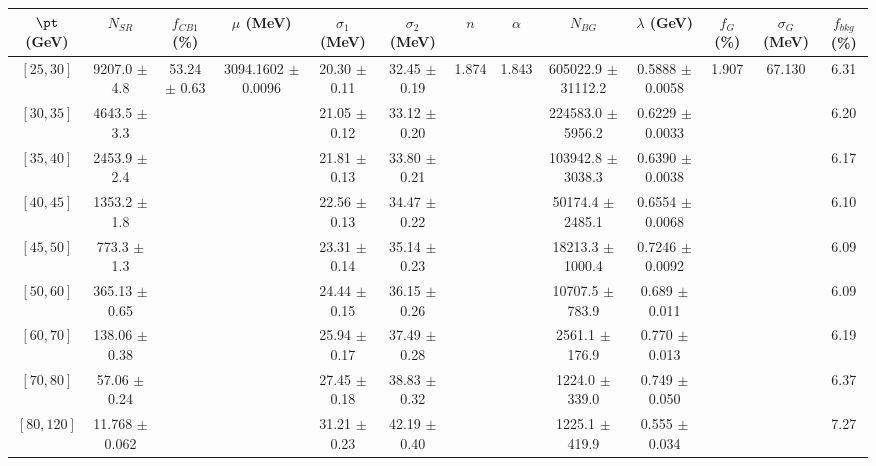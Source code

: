 \begin{tabular}{c||c|c|c|c|c|c|c|c|c|c|c||c}
$\pt$ (GeV) & $N_{SR}$ & $f_{CB1}$ (\%) & $\mu$ (MeV) & $\sigma_1$ (MeV) & $\sigma_2$ (MeV) & $n$ & $\alpha$ & $N_{BG}$ & $\lambda$ (GeV) & $f_G$ (\%) & $\sigma_G$ (MeV) & $f_{bkg}$ (\%) \\
\hline
$[25, 30]$ & 9207.0 $\pm$ 4.8 & \multirow{9}{*}{53.24 $\pm$ 0.63} & \multirow{9}{*}{3094.1602 $\pm$ 0.0096} & 20.30 $\pm$ 0.11 & 32.45 $\pm$ 0.19 & \multirow{9}{*}{1.874} & \multirow{9}{*}{1.843} & 605022.9 $\pm$ 31112.2 & 0.5888 $\pm$ 0.0058 & \multirow{9}{*}{1.907} & \multirow{9}{*}{67.130} & 6.31\\
$[30, 35]$ & 4643.5 $\pm$ 3.3 &  &  & 21.05 $\pm$ 0.12 & 33.12 $\pm$ 0.20 &  &  & 224583.0 $\pm$ 5956.2 & 0.6229 $\pm$ 0.0033 &  &  & 6.20\\
$[35, 40]$ & 2453.9 $\pm$ 2.4 &  &  & 21.81 $\pm$ 0.13 & 33.80 $\pm$ 0.21 &  &  & 103942.8 $\pm$ 3038.3 & 0.6390 $\pm$ 0.0038 &  &  & 6.17\\
$[40, 45]$ & 1353.2 $\pm$ 1.8 &  &  & 22.56 $\pm$ 0.13 & 34.47 $\pm$ 0.22 &  &  & 50174.4 $\pm$ 2485.1 & 0.6554 $\pm$ 0.0068 &  &  & 6.10\\
$[45, 50]$ & 773.3 $\pm$ 1.3 &  &  & 23.31 $\pm$ 0.14 & 35.14 $\pm$ 0.23 &  &  & 18213.3 $\pm$ 1000.4 & 0.7246 $\pm$ 0.0092 &  &  & 6.09\\
$[50, 60]$ & 365.13 $\pm$ 0.65 &  &  & 24.44 $\pm$ 0.15 & 36.15 $\pm$ 0.26 &  &  & 10707.5 $\pm$ 783.9 & 0.689 $\pm$ 0.011 &  &  & 6.09\\
$[60, 70]$ & 138.06 $\pm$ 0.38 &  &  & 25.94 $\pm$ 0.17 & 37.49 $\pm$ 0.28 &  &  & 2561.1 $\pm$ 176.9 & 0.770 $\pm$ 0.013 &  &  & 6.19\\
$[70, 80]$ & 57.06 $\pm$ 0.24 &  &  & 27.45 $\pm$ 0.18 & 38.83 $\pm$ 0.32 &  &  & 1224.0 $\pm$ 339.0 & 0.749 $\pm$ 0.050 &  &  & 6.37\\
$[80, 120]$ & 11.768 $\pm$ 0.062 &  &  & 31.21 $\pm$ 0.23 & 42.19 $\pm$ 0.40 &  &  & 1225.1 $\pm$ 419.9 & 0.555 $\pm$ 0.034 &  &  & 7.27\\
\end{tabular}
